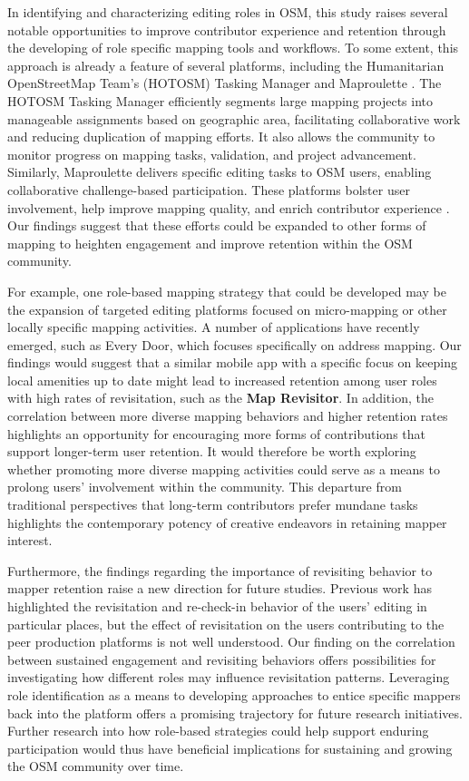\documentclass[manuscript,screen,review]{acmart}
\begin{document}
In identifying and characterizing editing roles in OSM, this study raises several notable opportunities to improve contributor experience and retention through the developing of role specific mapping tools and workflows. To some extent, this approach is already a feature of several platforms, including the Humanitarian OpenStreetMap Team's (HOTOSM) Tasking Manager \cite{hot_task_manager} and Maproulette \cite{maproulette}. The HOTOSM Tasking Manager efficiently segments large mapping projects into manageable assignments based on geographic area, facilitating collaborative work and reducing duplication of mapping efforts. It also allows the community to monitor progress on mapping tasks, validation, and project advancement. Similarly, Maproulette delivers specific editing tasks to OSM users, enabling collaborative challenge-based participation. These platforms bolster user involvement, help improve mapping quality, and enrich contributor experience \cite{herfort2021evolution}. Our findings suggest that these efforts could be expanded to other forms of mapping to heighten engagement and improve retention within the OSM community.

For example, one role-based mapping strategy that could be developed may be the expansion of targeted editing platforms focused on micro-mapping or other locally specific mapping activities. A number of applications have recently emerged, such as Every Door\cite{Every_door}, which focuses specifically on address mapping. Our findings would suggest that a similar mobile app with a specific focus on keeping local amenities up to date might lead to increased retention among user roles with high rates of revisitation, such as the \textbf{Map Revisitor}. In addition, the correlation between more diverse mapping behaviors and higher retention rates highlights an opportunity for encouraging more forms of contributions that support longer-term user retention. It would therefore be worth exploring whether promoting more diverse mapping activities could serve as a means to prolong users' involvement within the community. This departure from traditional perspectives that long-term contributors prefer mundane tasks\cite{shah_2006} highlights the contemporary potency of creative endeavors in retaining mapper interest. 

Furthermore, the findings regarding the importance of revisiting behavior to mapper retention raise a new direction for future studies. Previous work \cite{Chen20} has highlighted the revisitation and re-check-in behavior of the users' editing in particular places, but the effect of revisitation on the users contributing to the peer production platforms is not well understood. Our finding on the correlation between sustained engagement and revisiting behaviors offers possibilities for investigating how different roles may influence revisitation patterns. Leveraging role identification as a means to developing approaches to entice specific mappers back into the platform offers a promising trajectory for future research initiatives. Further research into how role-based strategies could help support enduring participation would thus have beneficial implications for sustaining and growing the OSM community over time.
\end{document}
